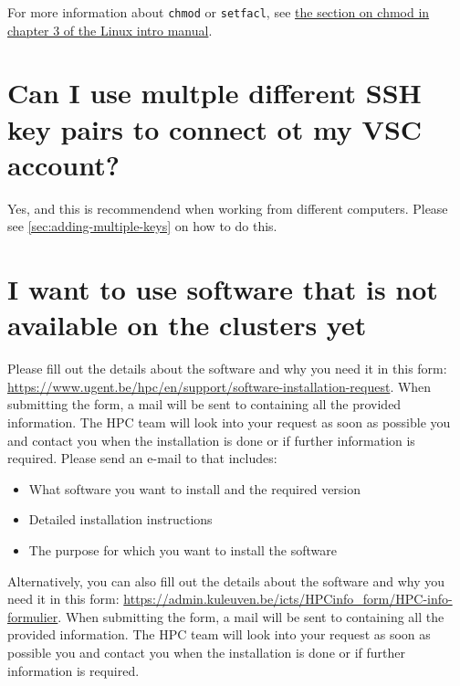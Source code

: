For more information about \lstinline|chmod| or \lstinline|setfacl|, see \href{\LinuxManualURL#sec:chmod}
{the section on chmod in chapter 3 of the Linux intro manual}.

\section{Can I use multple different SSH key pairs to connect ot my VSC account?}

Yes, and this is recommendend when working from different computers. Please see
\autoref{sec:adding-multiple-keys} on how to do this.

\section{I want to use software that is not available on the clusters yet}

\ifgent
Please fill out the details about the software and why you need it in this form:
\url{https://www.ugent.be/hpc/en/support/software-installation-request}.
When submitting the form, a mail will be sent to \hpcinfo containing all the
provided information. The HPC team will look into your request as soon as possible
you and contact you when the installation is done or if further information is required.
\else
Please send an e-mail to \hpcinfo that includes:
\begin{itemize}
    \item What software you want to install and the required version
    \item Detailed installation instructions
    \item The purpose for which you want to install the software
\end{itemize}

\ifleuven
Alternatively, you can also fill out the details about the software and why you need it in this form:
\url{https://admin.kuleuven.be/icts/HPCinfo_form/HPC-info-formulier}.
When submitting the form, a mail will be sent to \hpcinfo containing all the
provided information. The HPC team will look into your request as soon as possible
you and contact you when the installation is done or if further information is required.
\fi

